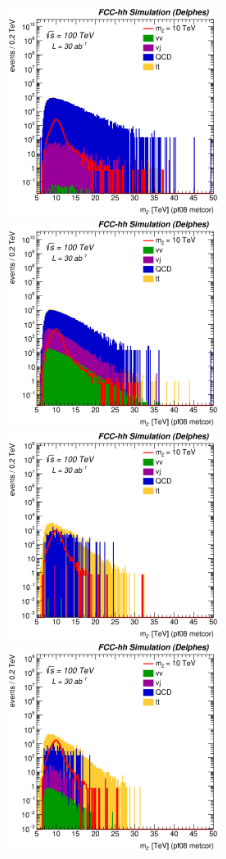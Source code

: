 \documentclass{cernrep}
\begin{document}
\begin{figure}[!htb]\centering
\includegraphics[width=0.495\textwidth]{Fig/Zptt/Mj1j2_pf08_MetCorr_sel2_nostack_log.eps}
\includegraphics[width=0.495\textwidth]{Fig/Zptt/Mj1j2_pf08_MetCorr_sel4_nostack_log.eps}
\includegraphics[width=0.495\textwidth]{Fig/Zptt/Mj1j2_pf08_MetCorr_sel5_nostack_log.eps}
\includegraphics[width=0.495\textwidth]{Fig/Zptt/Mj1j2_pf08_MetCorr_sel6_nostack_log.eps}

\end{figure}
\end{document}
